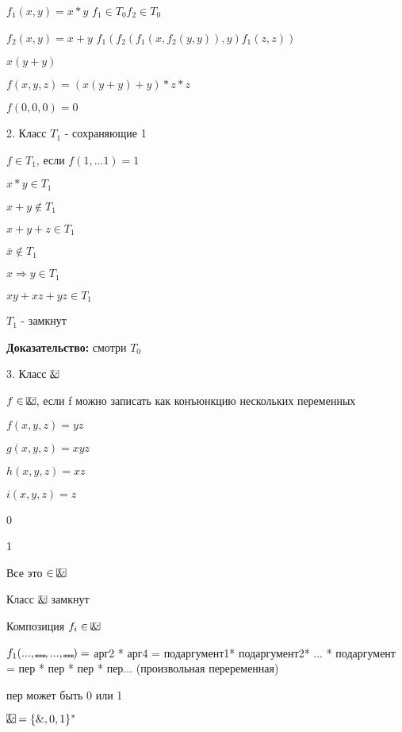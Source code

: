 \documentclass[russian]{lecture-notes}
\begin{document}
    \begin{example}
        $f_{1}(x,y) = x*y$ \qquad $f_{1} \in T_{0} f_{2} \in T_{0}$

        $f_{2}(x,y) = x+y$ \qquad $f_{1}(f_{2}(f_{1}(x,f_{2}(y,y)),y)f_{1}(z,z))$

        $x(y+y)$

        $f(x,y,z) = (x(y+y)+y)*z*z$

        $f(0,0,0) = 0$

        2. Класс $T_{1}$ - сохраняющие 1

        $f \in T_{1}$, если $f(1,...1) = 1$

        $x*y \in T_{1}$

        $x+y \notin T_{1}$

        $x+y+z \in T_{1}$

        $\bar{x} \notin T_{1}$

        $x \Rightarrow y \in T_{1}$

        $xy + xz + yz \in T_{1}$

        \begin{proposition}
            $T_{1}$ - замкнут
        \end {proposition}


        \textbf{Доказательство:} смотри $T_{0}$

        3. Класс $\frame{\&}$

        $f \in \frame{\&}$, если f можно записать как конъюнкцию нескольких переменных

        $f(x,y,z) = yz$

        $g(x,y,z) = xyz$

        $h(x,y,z) = xz$

        $i(x,y,z) = z$

        0

        1

        Все это $\in \frame{\&}$

        \begin{proposition}
            Класс $\frame{\&}$ замкнут
        \end{proposition}

        Композиция $f_{i} \in \frame{\&}$

        $f_1(...,\frame{...},...,\frame{...}) = $ арг2 * арг4 = подаргумент1* подаргумент2* ... * подаргумент =
        пер * пер * пер * пер... (произвольная переременная)

        пер может быть 0 или 1

        \begin{proposition}
            $\frame{\&} = \{\&,0,1\}^{*}$


\end{proposition}
\end{example}
\end{document}
